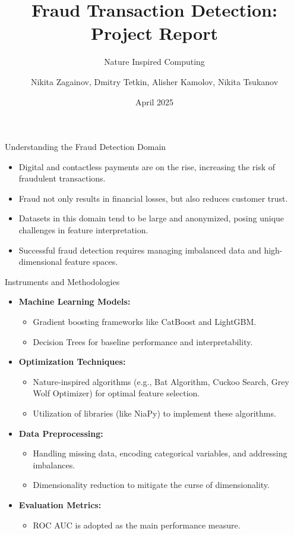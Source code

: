 \documentclass[aspectratio=169,xcolor=dvipsnames]{beamer}
\title{Fraud Transaction Detection: Project Report}
\subtitle{Nature Inspired Computing}
\author{Nikita Zagainov, Dmitry Tetkin, Alisher Kamolov, Nikita Tsukanov}
\institute
{
    Innopolis University
}
\date{April 2025} %
\begin{document}
\begin{frame}
	\titlepage
\end{frame}

\begin{frame}{Understanding the Fraud Detection Domain}
	\begin{itemize}
		\item Digital and contactless payments are on the rise, increasing the risk of fraudulent transactions.
		\item Fraud not only results in financial losses, but also reduces customer trust.
		\item Datasets in this domain tend to be large and anonymized, posing unique challenges in feature interpretation.
		\item Successful fraud detection requires managing imbalanced data and high-dimensional feature spaces.
	\end{itemize}
\end{frame}

\begin{frame}{Instruments and Methodologies}
	\begin{itemize}
		\item \textbf{Machine Learning Models:}
		\begin{itemize}
			\item Gradient boosting frameworks like CatBoost and LightGBM.
			\item Decision Trees for baseline performance and interpretability.
		\end{itemize}
		\item \textbf{Optimization Techniques:}
		\begin{itemize}
			\item Nature-inspired algorithms (e.g., Bat Algorithm, Cuckoo Search, Grey Wolf Optimizer) for optimal feature selection.
			\item Utilization of libraries (like NiaPy) to implement these algorithms.
		\end{itemize}
		\item \textbf{Data Preprocessing:}
		\begin{itemize}
			\item Handling missing data, encoding categorical variables, and addressing imbalances.
			\item Dimensionality reduction to mitigate the curse of dimensionality.
		\end{itemize}
		\item \textbf{Evaluation Metrics:}
		\begin{itemize}
			\item ROC AUC is adopted as the main performance measure.
		\end{itemize}
	\end{itemize}
\end{frame}
\end{document}
